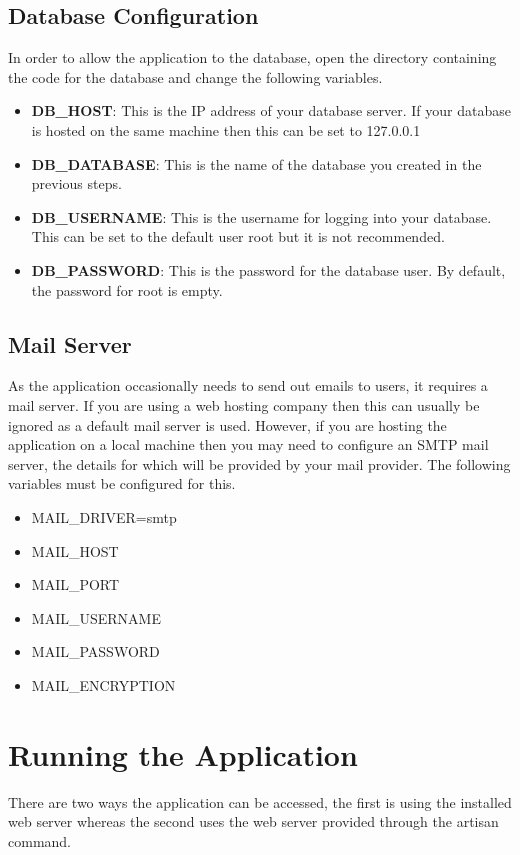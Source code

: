 \documentclass[12pt]{article}
\begin{document}
\subsection{Database Configuration}
In order to allow the application to the database, open the directory containing the code for the database and change the following variables.
\begin{itemize}
	\item \textbf{DB\_HOST}: This is the IP address of your database server. If your database is hosted on the same machine then this can be set to 127.0.0.1
	\item \textbf{DB\_DATABASE}: This is the name of the database you created in the previous steps.
	\item \textbf{DB\_USERNAME}: This is the username for logging into your database. This can be set to the default user root but it is not recommended.
	\item \textbf{DB\_PASSWORD}: This is the password for the database user. By default, the password for root is empty.
\end{itemize}

\subsection{Mail Server}
As the application occasionally needs to send out emails to users, it requires a mail server. If you are using a web hosting company then this can usually be ignored as a default mail server is used. However, if you are hosting the application on a local machine then you may need to configure an SMTP mail server, the details for which will be provided by your mail provider. The following variables must be configured for this.
\begin{itemize}
	\item MAIL\_DRIVER=smtp
	\item MAIL\_HOST
	\item MAIL\_PORT
	\item MAIL\_USERNAME
	\item MAIL\_PASSWORD
	\item MAIL\_ENCRYPTION
\end{itemize}

\section{Running the Application}
There are two ways the application can be accessed, the first is using the installed web server whereas the second uses the web server provided through the artisan command.
\end{document}
